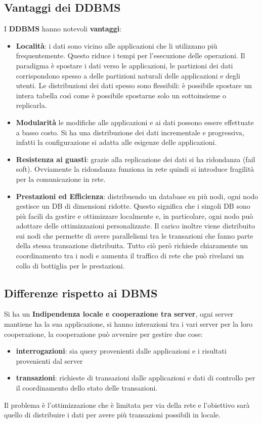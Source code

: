\subsection{Vantaggi dei DDBMS}
I \textbf{DDBMS} hanno notevoli \textbf{vantaggi}:
\begin{itemize}
    \item \textbf{Località}: i dati sono vicino alle applicazioni che li
          utilizzano più frequentemente. Questo riduce i tempi per l'esecuzione
          delle operazioni. Il paradigma è spostare i dati verso le
          applicazioni, le partizioni dei dati corrispondono spesso a delle
          partizioni naturali delle applicazioni e degli utenti. Le
          distribuzioni dei dati spesso sono flessibili: è possibile spostare un
          intera tabella così come è possibile spostarne solo un sottoinsieme
          o replicarla.
    \item \textbf{Modularità} le modifiche alle applicazioni e ai dati possono
          essere effettuate a basso costo. Si ha una distribuzione dei dati incrementale e
          progressiva, infatti la configurazione si adatta alle esigenze delle applicazioni.
    \item \textbf{Resistenza ai guasti}: grazie alla replicazione dei dati si ha
          ridondanza (fail soft). Ovviamente la ridondanza funziona in rete quindi
          si introduce fragilità per la comunicazione in rete.
    \item \textbf{Prestazioni ed Efficienza}: distribuendo un database su più
          nodi, ogni nodo gestisce un DB di dimensioni ridotte. Questo
          significa che i singoli DB sono più facili da gestire e ottimizzare
          localmente e, in particolare, ogni nodo può adottare delle
          ottimizzazioni personalizzate. Il carico inoltre viene distribuito
          sui nodi che permette di avere parallelismi tra le transazioni che fanno
          parte della stessa transazione distribuita.
          Tutto ciò però richiede chiaramente un coordinamento tra i
          nodi e aumenta il traffico di rete che può rivelarsi un collo di
          bottiglia per le prestazioni.
\end{itemize}

\subsection{Differenze rispetto ai DBMS}
Si ha un \textbf{Indipendenza locale e cooperazione tra server}, ogni server
mantiene ha la sua applicazione, si hanno interazioni tra i vari server per la
loro cooperazione, la cooperazione può avvenire per gestire due cose:
\begin{itemize}
    \item \textbf{interrogazioni}: sia query provenienti dalle applicazioni e
          i risultati provenienti dal server
    \item \textbf{transazioni}: richieste di transazioni dalle applicazioni  e
          dati di controllo per il coordinamento dello stato delle transazioni.
\end{itemize}
Il problema è l'ottimizzazione che è limitata per via della rete e l'obiettivo
sarà quello di distribuire i dati per avere più transazioni possibili in locale.

